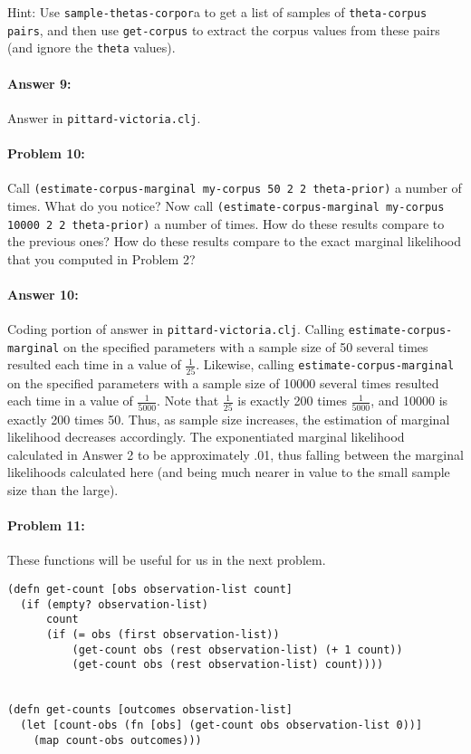\documentclass[10pt]{article}
\begin{document}
\noindent Hint: Use \texttt{sample-thetas-corpor}a to get a list of
samples of \texttt{theta-corpus pairs}, and then use
\texttt{get-corpus} to extract the corpus values from these pairs (and
ignore the \texttt{theta} values).

\paragraph{Answer 9:} Answer in
\texttt{pittard-victoria.clj}.

\hrulefill
\paragraph{Problem 10:}

\noindent Call \texttt{(estimate-corpus-marginal my-corpus 50 2 2
  theta-prior)} a number of times. What do you notice? Now call
\texttt{(estimate-corpus-marginal my-corpus 10000 2 2 theta-prior)} a
number of times. How do these results compare to the previous ones?
How do these results compare to the exact marginal
likelihood that you computed in Problem 2?

\paragraph{Answer 10:} Coding portion of answer in
\texttt{pittard-victoria.clj}. \newline
Calling \texttt{estimate-corpus-marginal} on the specified parameters with a sample size of 50 several times resulted each time in a value of $\frac{1}{25}$. Likewise, calling \texttt{estimate-corpus-marginal} on the specified parameters with a sample size of 10000 several times resulted each time in a value of $\frac{1}{5000}$. Note that $\frac{1}{25}$ is exactly 200 times $\frac{1}{5000}$, and 10000 is exactly 200 times 50. Thus, as sample size increases, the estimation of marginal likelihood decreases accordingly. The exponentiated marginal likelihood calculated in Answer 2 to be approximately .01, thus falling between the marginal likelihoods calculated here (and being much nearer in value to the small sample size than the large).

\hrulefill
\paragraph{Problem 11:}
These functions will be useful for us in the next problem.

\begin{lstlisting}
(defn get-count [obs observation-list count]
  (if (empty? observation-list)
      count
      (if (= obs (first observation-list))
          (get-count obs (rest observation-list) (+ 1 count))
          (get-count obs (rest observation-list) count))))


(defn get-counts [outcomes observation-list]
  (let [count-obs (fn [obs] (get-count obs observation-list 0))]
    (map count-obs outcomes)))
\end{lstlisting}
\end{document}
